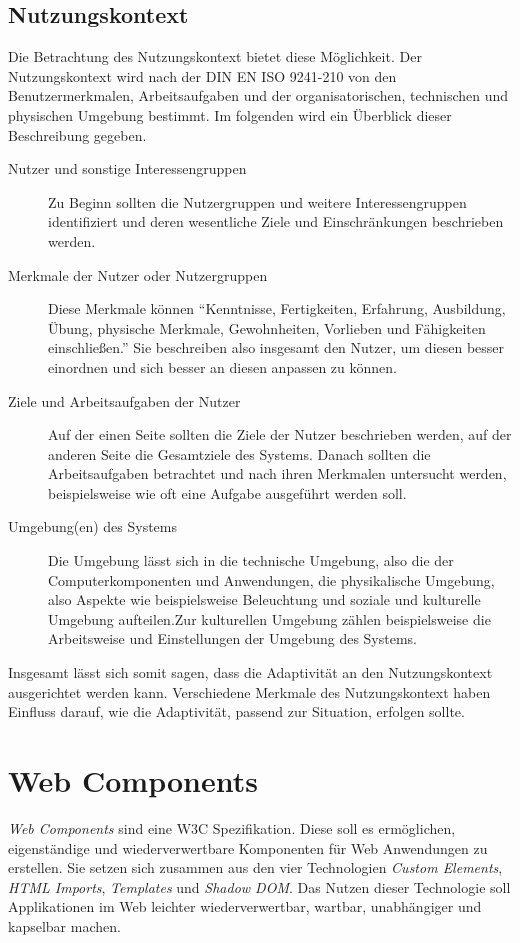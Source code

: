 \documentclass[12pt, paper=a4, bibtotoc, toc=listof, headsepline=true]{scrreprt}
\begin{document}
	\section{Nutzungskontext}
	Die Betrachtung des Nutzungskontext bietet diese Möglichkeit. Der Nutzungskontext wird nach der DIN EN ISO 9241-210 von den Benutzermerkmalen, Arbeitsaufgaben und der organisatorischen, technischen und physischen Umgebung bestimmt. Im folgenden wird ein Überblick dieser Beschreibung gegeben.
	\begin{description}  
		\item  [Nutzer und sonstige Interessengruppen] 
		Zu Beginn sollten die Nutzergruppen und weitere Interessengruppen identifiziert und deren wesentliche Ziele und Einschränkungen beschrieben werden.
			
		\item [Merkmale der Nutzer oder Nutzergruppen]
		Diese Merkmale können \enquote{Kenntnisse, Fertigkeiten, Erfahrung, Ausbildung, Übung, physische Merkmale, Gewohnheiten, Vorlieben und Fähigkeiten einschließen.}\cite[S.16 ]{hoffmann2014venus} Sie beschreiben also insgesamt den Nutzer, um diesen besser einordnen und sich besser an diesen anpassen zu können.
		
		\item  [Ziele und Arbeitsaufgaben der Nutzer]
		Auf der einen Seite sollten die Ziele der Nutzer beschrieben werden, auf der anderen Seite die Gesamtziele des Systems. Danach sollten die Arbeitsaufgaben betrachtet und nach ihren Merkmalen untersucht werden, beispielsweise wie oft eine Aufgabe ausgeführt werden soll.
			
		\item [Umgebung(en) des Systems]
		Die Umgebung lässt sich in die technische Umgebung, also die der Computerkomponenten und Anwendungen, die physikalische Umgebung, also Aspekte wie beispielsweise Beleuchtung und soziale und kulturelle Umgebung aufteilen.Zur kulturellen Umgebung zählen beispielsweise die Arbeitsweise und Einstellungen der Umgebung des Systems.\cite[vgl. S.15 ff.]{hoffmann2014venus}
	\end{description}
	Insgesamt lässt sich somit sagen, dass die Adaptivität an den Nutzungskontext ausgerichtet werden kann. Verschiedene Merkmale des Nutzungskontext haben Einfluss darauf, wie die Adaptivität, passend zur Situation, erfolgen sollte.
		
\chapter{Web Components}
	\emph{Web Components} sind eine \ac{W3C} Spezifikation. Diese soll es ermöglichen, eigenständige und wiederverwertbare Komponenten für Web Anwendungen zu erstellen. \cite[vgl. S. 1]{patel2015learning} Sie setzen sich zusammen aus den vier Technologien \emph{Custom Elements}, \emph{\ac{HTML} Imports}, \emph{Templates} und \emph{Shadow \ac{DOM}}. Das Nutzen dieser Technologie soll Applikationen im Web leichter wiederverwertbar, wartbar, unabhängiger und kapselbar machen.\cite[vgl. S.2]{patel2015learning}
\end{document}

